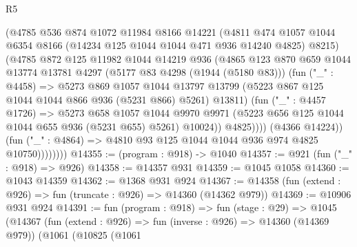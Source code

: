 \begin{lexlean}{R5}
\begin{coremodule}
                        (@4785
                          @536
                          @874
                          @1072
                          @11984
                          @8166
                          @14221
                          (@4811
                            @474
                            @1057
                            @1044
                            @6354
                            @8166
                            (@14234 @125 @1044 @1044 @471 @936 @14240 @4825)
                            @8215)
                          (@4785
                            @872
                            @125
                            @11982
                            @1044
                            @14219
                            @936
                            (@4865
                              @123
                              @870
                              @659
                              @1044
                              @13774
                              @13781
                              @4297
                              (@5177 @83 @4298 (@1944 (@5180 @83)))
                              (fun ("_" : @4458) =>
                              @5273
                                @869
                                @1057
                                @1044
                                @13797
                                @13799
                                (@5223 @867 @125 @1044 @1044 @866 @936 (@5231 @866) @5261)
                                @13811)
                              (fun ("_" : @4457 @1726) =>
                              @5273
                                @658
                                @1057
                                @1044
                                @9970
                                @9971
                                (@5223 @656 @125 @1044 @1044 @655 @936 (@5231 @655) @5261)
                                @10024))
                            @4825))))
                    (@4366 @14224))
                  (fun ("_" : @4864) => @4810 @93 @125 @1044 @1044 @936 @974 @4825 @10750))))))))
@14355 := (program : @918) -> @1040
@14357 := @921 (fun ("_" : @918) => @926)
@14358 := @14357 @931
@14359 := @1045 @1058
@14360 := @1043 @14359
@14362 := @1368 @931 @924
@14367 := @14358 (fun (extend : @926) => fun (truncate : @926) => @14360 (@14362 @979))
@14369 := @10906 @931 @924
@14391 := fun (program : @918) =>
  fun (stage : @29) =>
  @1045
    (@14367
      (fun (extend : @926) => fun (inverse : @926) => @14360 (@14369 @979))
      (@1061
        (@10825
          (@1061

\end{coremodule}
\end{lexlean}

